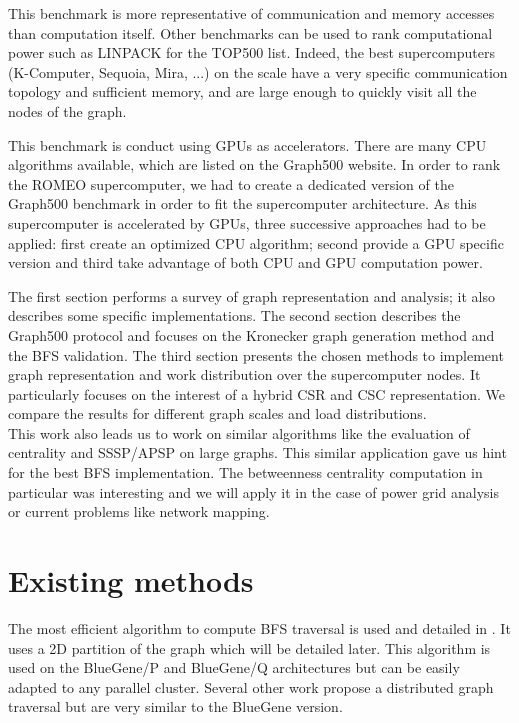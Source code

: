 This benchmark is more representative of communication and memory accesses than computation itself. 
Other benchmarks can be used to rank computational power such as LINPACK for the TOP500 list.
Indeed, the best supercomputers (K-Computer, Sequoia, Mira, ...) on the scale have a very specific communication topology and sufficient memory, and are large enough to quickly visit all the nodes of the graph. 

This benchmark is conduct using GPUs as accelerators.
There are many CPU algorithms available, which are listed on the Graph500 website. 
In order to rank the ROMEO supercomputer, we had to create a dedicated version of the Graph500 benchmark in order to fit the supercomputer architecture. 
As this supercomputer is accelerated by GPUs, three successive approaches had to be applied:  first create an optimized CPU algorithm; second provide a GPU specific version and third take advantage of both CPU and GPU computation power. 

The first section performs a survey of graph representation and analysis; it also describes some specific implementations.
The second section describes the Graph500 protocol and focuses on the Kronecker graph generation method and the BFS validation.
The third section presents the chosen methods to implement graph representation and work distribution over the supercomputer nodes. It particularly focuses on the interest of a hybrid CSR and CSC representation.
We compare the results for different graph scales and load distributions.\\

This work also leads us to work on similar algorithms like the evaluation of centrality\cite{bader2006parallel,brandes2007centrality,brandes2001faster,geisberger2008better,jin2010novel,shi_fast_2011,sariyuce2013betweenness} and SSSP/APSP\cite{davidson2014work,djidjev_efficient_2014} on large graphs. 
This similar application gave us hint for the best BFS implementation.
The betweenness centrality computation in particular was interesting and we will apply it in the case of power grid analysis or current problems like network mapping\cite{krebs2002mapping,soman_fast_2011}. 

\section{Existing methods}
The most efficient algorithm to compute BFS traversal is used and detailed in \cite{6468459}. 
It uses a 2D partition of the graph which will be detailed later. 
This algorithm is used on the BlueGene/P and BlueGene/Q architectures but can be easily adapted to any parallel cluster.
Several other work\cite{gonzalez2012powergraph} propose a distributed graph traversal but are very similar to the BlueGene version.

